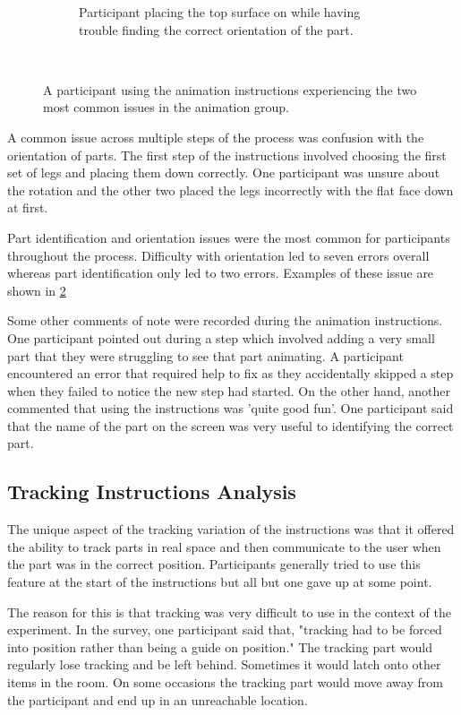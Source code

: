 \documentclass{l4proj}
\begin{document}
\begin{figure}[hbt!]
\begin{subfigure}[b]{0.45\textwidth}
        \caption{Participant placing the top surface on while having trouble finding the correct orientation of the part.}
        \label{fig:expTop}
    \end{subfigure}
    ~ %
    \caption{A participant using the animation instructions experiencing the two most common issues in the animation group.}
    \label{fig:expAnim}
\end{figure}

A common issue across multiple steps of the process was confusion with the orientation of parts. The first step of the instructions involved choosing the first set of legs and placing them down correctly. One participant was unsure about the rotation and the other two placed the legs incorrectly with the flat face down at first.

Part identification and orientation issues were the most common for participants throughout the process. Difficulty with orientation led to seven errors overall whereas part identification only led to two errors. Examples of these issue are shown in \ref{fig:expAnim}

Some other comments of note were recorded during the animation instructions. One participant pointed out during a step which involved adding a very small part that they were struggling to see that part animating. A participant encountered an error that required help to fix as they accidentally skipped a step when they failed to notice the new step had started. On the other hand, another commented that using the instructions was 'quite good fun'. One participant said that the name of the part on the screen was very useful to identifying the correct part.

\subsection{Tracking Instructions Analysis}

The unique aspect of the tracking variation of the instructions was that it offered the ability to track parts in real space and then communicate to the user when the part was in the correct position. Participants generally tried to use this feature at the start of the instructions but all but one gave up at some point.

The reason for this is that tracking was very difficult to use in the context of the experiment. In the survey, one participant said that, "tracking had to be forced into position rather than being a guide on position." The tracking part would regularly lose tracking and be left behind. Sometimes it would latch onto other items in the room. On some occasions the tracking part would move away from the participant and end up in an unreachable location.
\end{document}
